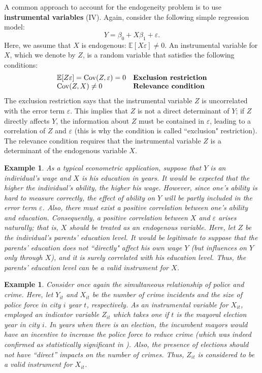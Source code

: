 \documentclass[10.5pt, A4paper, openany, uplatex]{book}
\newcommand{\eps}{\varepsilon}
\newcommand{\E}{\mathbb{E}}
\newcommand{\Cov}{\mathrm{Cov}}
\newtheorem{example}[theorem]{Example}
\numberwithin{equation}{section}
\begin{document}
A common approach to account for the endogeneity problem is to use \textbf{instrumental variables} (IV).
Again, consider the following simple regression model: 
\[
	Y = \beta_0 + X \beta_1 + \eps.
\]
Here, we assume that $X$ is endogenous: $\E[X\eps] \neq 0$.
An instrumental variable for $X$, which we denote by $Z$, is a random variable that satisfies the following conditions:
\[
\begin{array}{ll}
	\E[Z \eps] = \Cov(Z, \eps) = 0 & \textbf{Exclusion restriction\index{exclusion restriction}} \\
	\Cov(Z, X) \neq 0 & \textbf{Relevance condition\index{relevance condition}}
\end{array}
\]
The exclusion restriction says that the instrumental variable $Z$ is uncorrelated with the error term $\eps$.
This implies that $Z$ is not a direct determinant of $Y$; if $Z$ directly affects $Y$, the information about $Z$ must be contained in $\eps$, leading to a correlation of $Z$ and $\eps$ (this is why the condition is called ``exclusion" restriction).
The relevance condition requires that the instrumental variable $Z$ is a determinant of the endogenous variable $X$.

\begin{example}\upshape
	As a typical econometric application, suppose that $Y$ is an individual's wage and $X$ is his education in years.
	It would be expected that the higher the individual's ability, the higher his wage.
	However, since one's ability is hard to measure correctly, the effect of ability on $Y$ will be partly included in the error term $\eps$.
	Also, there must exist a positive correlation between one's ability and education.
	Consequently, a positive correlation between $X$ and $\eps$ arises naturally; that is, $X$ should be treated as an endogenous variable.
	Here, let $Z$ be the individual's parents' education level.
	It would be legitimate to suppose that the parents' education does not ``directly" affect his own wage $Y$ (but influences on $Y$ only through $X$), and it is surely correlated with his education level.
	Thus, the parents' education level can be a valid instrument for $X$.
\end{example}

\begin{example}\upshape
	Consider once again the simultaneous relationship of police and crime.
	Here, let $Y_{it}$ and $X_{it}$ be the number of crime incidents and the size of police force in city $i$ year $t$, respectively.
	As an instrumental variable for $X_{it}$, \cite{levitt1997using} employed an indicator variable $Z_{it}$ which takes one if $t$ is the mayoral election year in city $i$.
	In years when there is an election, the incumbent mayors would have an incentive to increase the police force to reduce crime (which was indeed confirmed as statistically significant in \cite{levitt1997using}).
	Also, the presence of elections should not have ``direct'' impacts on the number of crimes.
	Thus, $Z_{it}$ is considered to be a valid instrument for $X_{it}$. 
\end{example}
\end{document}
